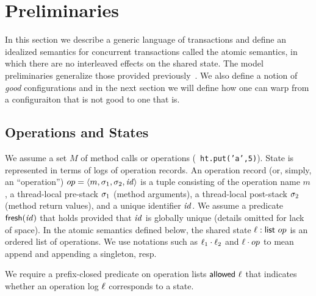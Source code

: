 \newcommand\obseq{\stackrel{\sim}{=}}
\newcommand\CS{\{c,\sigma\}}
\newcommand\CpSp{\{c',\sigma'\}}
\newcommand\numCS[1]{\{c_{#1},\sigma_{#1}\}}

\newcommand\tstep[3]{#1 \lightning (#2,#3)}
\newcommand\stept{\lightning\!\lightning}
\renewcommand\step[3]{#1 \stept (#2,#3)}

\newcommand\BigStep{\Downarrow}


\section{Preliminaries}

In this section we describe a generic language of transactions and
define an idealized semantics for concurrent transactions called the
atomic semantics, in which there are no interleaved effects on the
shared state. 
%
The model preliminaries generalize those provided previously~\cite{PMPY}.
%
We also define a notion of \emph{good} configurations
and in the next section we will define how one can warp from a 
configuraiton that is not good to one that is.

\subsection{Operations and States}

We assume a set $M$ of method calls or operations (\eg\
  \texttt{ht.put('a',5)}).
%
State is represented in terms of
logs of operation records. An operation record (or, simply, an ``operation'')
$
    op = \langle m, \sigma_1, \sigma_2, \mathit{id} \rangle
$
is a tuple consisting of the operation name $m$, 
a thread-local pre-stack $\sigma_1$ (method arguments),
a thread-local post-stack $\sigma_2$ (method return values),
and a unique identifier $\mathit{id}$.
%
We assume a predicate $\textsf{fresh}(\mathit{id})$ that holds provided that $\mathit{id}$
is globally unique (details omitted for lack of space).
%
In the atomic semantics defined below, the shared state $\ell :
\textsf{list } op$ is an ordered list of operations.
%
We use notations such as $\ell_1\cdot\ell_2$ and $\ell\cdot op$ to
mean append and appending a singleton, resp.

\begin{parameter} 
We require a prefix-closed predicate on operation lists $\textsf{allowed}\ \ell$
that indicates whether an operation log $\ell$ corresponds to a state.
\end{parameter}

